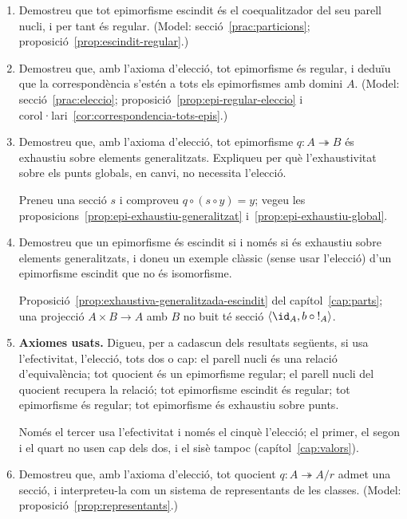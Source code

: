 \begin{enumerate}[resume]
  \item Demostreu que tot epimorfisme escindit és el coequalitzador del seu parell nucli, i per tant és regular. (Model: secció~\ref{prac:particions}; proposició~\ref{prop:escindit-regular}.)

  \item Demostreu que, amb l'axioma d'elecció, tot epimorfisme és regular, i deduïu que la correspondència s'estén a tots els epimorfismes amb domini \(A\). (Model: secció~\ref{prac:eleccio}; proposició~\ref{prop:epi-regular-eleccio} i corol·lari~\ref{cor:correspondencia-tots-epis}.)

  \item Demostreu que, amb l'axioma d'elecció, tot epimorfisme \(q\colon A\twoheadrightarrow B\) és exhaustiu sobre elements generalitzats. Expliqueu per què l'exhaustivitat sobre els punts globals, en canvi, no necessita l'elecció. \begin{indicacio}Preneu una secció \(s\) i comproveu \(q\circ(s\circ y)=y\); vegeu les proposicions~\ref{prop:epi-exhaustiu-generalitzat} i~\ref{prop:epi-exhaustiu-global}.\end{indicacio}

  \item Demostreu que un epimorfisme és escindit si i només si és exhaustiu sobre elements generalitzats, i doneu un exemple clàssic (sense usar l'elecció) d'un epimorfisme escindit que no és isomorfisme. \begin{indicacio}Proposició~\ref{prop:exhaustiva-generalitzada-escindit} del capítol~\ref{cap:parts}; una projecció \(A\times B\to A\) amb \(B\) no buit té secció \(\langle\id_A,b\circ{!}_A\rangle\).\end{indicacio}

  \item \textbf{Axiomes usats.} Digueu, per a cadascun dels resultats següents, si usa l'efectivitat, l'elecció, tots dos o cap: el parell nucli és una relació d'equivalència; tot quocient és un epimorfisme regular; el parell nucli del quocient recupera la relació; tot epimorfisme escindit és regular; tot epimorfisme és regular; tot epimorfisme és exhaustiu sobre punts. \begin{indicacio}Només el tercer usa l'efectivitat i només el cinquè l'elecció; el primer, el segon i el quart no usen cap dels dos, i el sisè tampoc (capítol~\ref{cap:valors}).\end{indicacio}

  \item Demostreu que, amb l'axioma d'elecció, tot quocient \(q\colon A\twoheadrightarrow A/r\) admet una secció, i interpreteu-la com un sistema de representants de les classes. (Model: proposició~\ref{prop:representants}.)
\end{enumerate}
